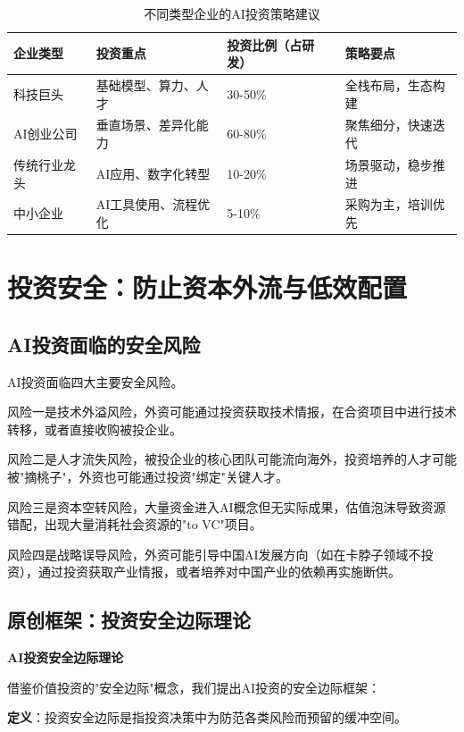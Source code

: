 \begin{table}[H]
\centering
\caption{不同类型企业的AI投资策略建议}
\small
\begin{tabular}{p{2.3cm}p{3.3cm}p{3.3cm}p{3.3cm}}
\toprule
\textbf{企业类型} & \textbf{投资重点} & \textbf{投资比例（占研发）} & \textbf{策略要点} \\
\midrule
科技巨头 & 基础模型、算力、人才 & 30-50\% & 全栈布局，生态构建 \\
AI创业公司 & 垂直场景、差异化能力 & 60-80\% & 聚焦细分，快速迭代 \\
传统行业龙头 & AI应用、数字化转型 & 10-20\% & 场景驱动，稳步推进 \\
中小企业 & AI工具使用、流程优化 & 5-10\% & 采购为主，培训优先 \\
\bottomrule
\end{tabular}
\end{table}

\section{投资安全：防止资本外流与低效配置}

\subsection{AI投资面临的安全风险}

AI投资面临四大主要安全风险。

风险一是技术外溢风险，外资可能通过投资获取技术情报，在合资项目中进行技术转移，或者直接收购被投企业。

风险二是人才流失风险，被投企业的核心团队可能流向海外，投资培养的人才可能被"摘桃子"，外资也可能通过投资"绑定"关键人才。

风险三是资本空转风险，大量资金进入AI概念但无实际成果，估值泡沫导致资源错配，出现大量消耗社会资源的"to VC"项目。

风险四是战略误导风险，外资可能引导中国AI发展方向（如在卡脖子领域不投资），通过投资获取产业情报，或者培养对中国产业的依赖再实施断供。

\subsection{原创框架：投资安全边际理论}

\textbf{AI投资安全边际理论}

借鉴价值投资的"安全边际"概念，我们提出AI投资的安全边际框架：

\textbf{定义}：投资安全边际是指投资决策中为防范各类风险而预留的缓冲空间。

